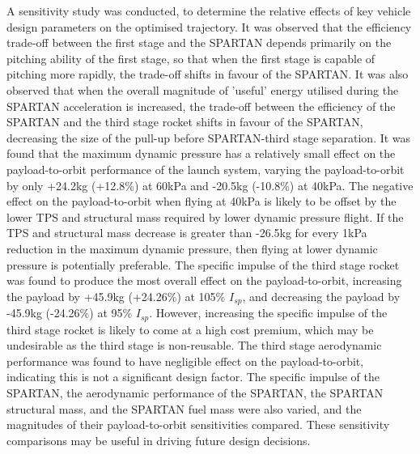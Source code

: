 A sensitivity study was conducted, to determine the relative effects of key vehicle design parameters on the optimised trajectory. 
It was observed that the efficiency trade-off between the first stage and the SPARTAN depends primarily on the pitching ability of the first stage, so that when the first stage is capable of pitching more rapidly, the trade-off shifts in favour of the SPARTAN. 
It was also observed that when the overall magnitude of 'useful' energy utilised during the SPARTAN acceleration is increased, the trade-off between the efficiency of the SPARTAN and the third stage rocket shifts in favour of the SPARTAN, decreasing the size of the pull-up before SPARTAN-third stage separation. 
It was found that the maximum dynamic pressure has a relatively small effect on the payload-to-orbit performance of the launch system, varying the payload-to-orbit by only +24.2kg (+12.8\%) at 60kPa and -20.5kg (-10.8\%) at 40kPa. The negative effect on the payload-to-orbit when flying at 40kPa is likely to be offset by the lower TPS and structural mass required by lower dynamic pressure flight. If the TPS and structural mass decrease is greater than -26.5kg for every 1kPa reduction in the maximum dynamic pressure, then flying at lower dynamic pressure is potentially preferable. 
The specific impulse of the third stage rocket was found to produce the most overall effect on the payload-to-orbit, increasing the payload by +45.9kg (+24.26\%) at 105\% $I_{sp}$, and decreasing the payload by -45.9kg (-24.26\%) at 95\% $I_{sp}$. However, increasing the specific impulse of the third stage rocket is likely to come at a high cost premium, which may be undesirable as the third stage is non-reusable. 
The third stage aerodynamic performance was found to have negligible effect on the payload-to-orbit, indicating this is not a significant design factor. 
The specific impulse of the SPARTAN, the aerodynamic performance of the SPARTAN, the SPARTAN structural mass, and the SPARTAN fuel mass were also varied, and the magnitudes of their payload-to-orbit sensitivities compared. 
These sensitivity comparisons may be useful in driving future design decisions. 





